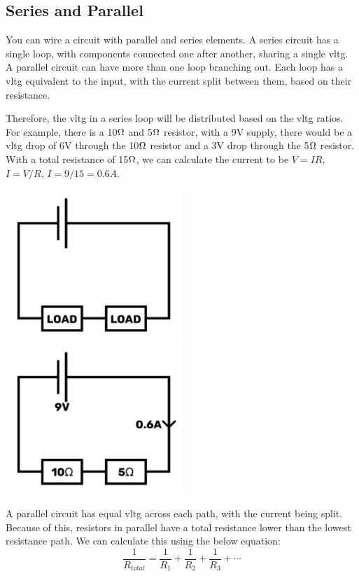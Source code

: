\documentclass[a4paper,11pt]{report}
\begin{document}
\subsection{Series and Parallel}

You can wire a circuit with parallel and series elements. A series circuit has a single loop, with components connected one after another, sharing a single \gls{vltg}. A parallel circuit can have more than one loop branching out. Each loop has a \gls{vltg} equivalent to the input, with the current split between them, based on their resistance.

Therefore, the \gls{vltg} in a series loop will be distributed based on the \gls{vltg} ratios. For example, there is a 10$\ohm$ and 5$\ohm$ resistor, with a 9V supply, there would be a \gls{vltg} drop of 6V through the 10$\ohm$ resistor and a 3V drop through the 5$\ohm$ resistor. With a total resistance of 15$\ohm$, we can calculate the current to be $V=IR$, $I=V/R$, $I=9/15=0.6A$.

\includegraphics[width=0.5\textwidth]{series1}
\includegraphics[width=0.5\textwidth]{series2}

A parallel circuit has equal \gls{vltg} across each path, with the current being split. Because of this, resistors in parallel have a total resistance lower than the lowest resistance path.
We can calculate this using the below equation:
\[\frac{1}{R_{total}} = \frac{1}{R_1} + \frac{1}{R_2} + \frac{1}{R_3} + \cdots\]
\end{document}
